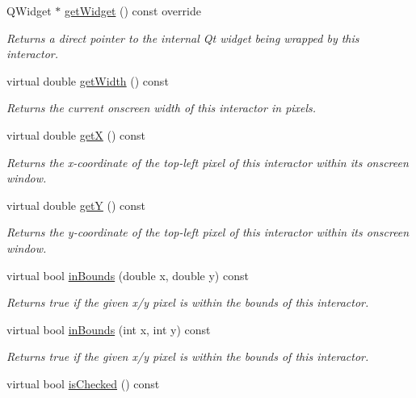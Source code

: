 \begin{DoxyCompactItemize}
Q\+Widget $\ast$ \mbox{\hyperlink{classGCheckBox_a3b33a602b31a6b809d020535a59db3b4}{get\+Widget}} () const override
\begin{DoxyCompactList}\small\item\em Returns a direct pointer to the internal Qt widget being wrapped by this interactor. \end{DoxyCompactList}\item 
virtual double \mbox{\hyperlink{classGInteractor_a0ed2965abd4f5701d2cadf71239faf19}{get\+Width}} () const
\begin{DoxyCompactList}\small\item\em Returns the current onscreen width of this interactor in pixels. \end{DoxyCompactList}\item 
virtual double \mbox{\hyperlink{classGInteractor_a344385751bee0720059403940d57a13e}{getX}} () const
\begin{DoxyCompactList}\small\item\em Returns the x-\/coordinate of the top-\/left pixel of this interactor within its onscreen window. \end{DoxyCompactList}\item 
virtual double \mbox{\hyperlink{classGInteractor_aafa51c7f8f38a09febbb9ce7853f77b4}{getY}} () const
\begin{DoxyCompactList}\small\item\em Returns the y-\/coordinate of the top-\/left pixel of this interactor within its onscreen window. \end{DoxyCompactList}\item 
virtual bool \mbox{\hyperlink{classGInteractor_afc480f652b8c5f1fb255e2269ce68879}{in\+Bounds}} (double x, double y) const
\begin{DoxyCompactList}\small\item\em Returns true if the given x/y pixel is within the bounds of this interactor. \end{DoxyCompactList}\item 
virtual bool \mbox{\hyperlink{classGInteractor_ae6d7982c1c627b677a5e776ca86118ed}{in\+Bounds}} (int x, int y) const
\begin{DoxyCompactList}\small\item\em Returns true if the given x/y pixel is within the bounds of this interactor. \end{DoxyCompactList}\item 
virtual bool \mbox{\hyperlink{classGCheckBox_ac8cada18b9357ff68b26e17f44294764}{is\+Checked}} () const

\end{DoxyCompactItemize}
